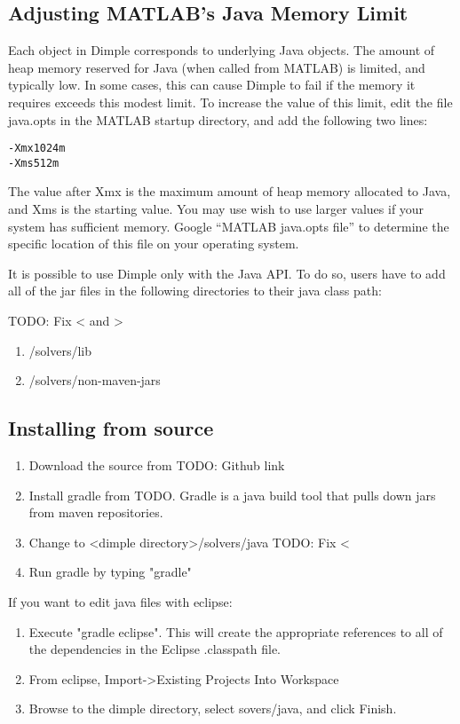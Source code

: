 \subsection{Adjusting MATLAB's Java Memory Limit}

Each object in Dimple corresponds to underlying Java objects. The amount of heap memory reserved for Java (when called from MATLAB) is limited, and typically low.  In some cases, this can cause Dimple to fail if the memory it requires exceeds this modest limit.  To increase the value of this limit, edit the file java.opts in the MATLAB startup directory, and add the following two lines:

\begin{lstlisting}
-Xmx1024m
-Xms512m
\end{lstlisting}

The value after Xmx is the maximum amount of heap memory allocated to Java, and Xms is the starting value.  You may use wish to use larger values if your system has sufficient memory.  Google ``MATLAB java.opts file'' to determine the specific location of this file on your operating system.



\fi

\ifjava

It is possible to use Dimple only with the Java API.  To do so, users have to add all of the jar files in the following directories to their java class path:

TODO: Fix < and >
\begin{enumerate}
\item <java directory>/solvers/lib
\item <java directory>/solvers/non-maven-jars
\end{enumerate}

\fi

\subsection{Installing from source}

\begin{enumerate}
\item Download the source from TODO: Github link
\item Install gradle from TODO.  Gradle is a java build tool that pulls down jars from maven repositories.
\item Change to <dimple directory>/solvers/java  TODO: Fix <
\item Run gradle by typing "gradle"
\end{enumerate}

If you want to edit java files with eclipse:

\begin{enumerate}
\item Execute "gradle eclipse".  This will create the appropriate references to all of the dependencies in the Eclipse .classpath file.
\item From eclipse, Import->Existing Projects Into Workspace
\item Browse to the dimple directory, select sovers/java, and click Finish.
\end{enumerate}
